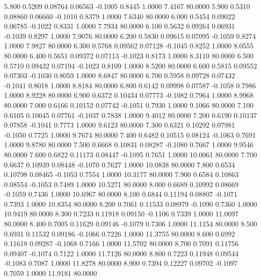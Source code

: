    5.800   0.5209   0.08764   0.06563  -0.1005   0.8445   1.0000   7.4167  80.0000
   5.900   0.5310   0.08860   0.06660  -0.1010   0.8379   1.0000   7.6340  80.0000
   6.000   0.5454   0.09022   0.06785  -0.1022   0.8331   1.0000   7.7934  80.0000
   6.100   0.5632   0.09264   0.06931  -0.1039   0.8297   1.0000   7.9076  80.0000
   6.200   0.5830   0.09615   0.07095  -0.1059   0.8274   1.0000   7.9827  80.0000
   6.300   0.5768   0.09562   0.07128  -0.1045   0.8252   1.0000   8.0555  80.0000
   6.400   0.5651   0.09372   0.07113  -0.1023   0.8173   1.0000   8.3110  80.0000
   6.500   0.5710   0.09432   0.07194  -0.1023   0.8109   1.0000   8.5200  80.0000
   6.600   0.5815   0.09552   0.07303  -0.1030   0.8059   1.0000   8.6847  80.0000
   6.700   0.5958   0.09728   0.07432  -0.1041   0.8018   1.0000   8.8184  80.0000
   6.800   0.6142   0.09998   0.07587  -0.1058   0.7986   1.0000   8.9228  80.0000
   6.900   0.6372   0.10434   0.07773  -0.1082   0.7964   1.0000   8.9968  80.0000
   7.000   0.6166   0.10152   0.07742  -0.1051   0.7930   1.0000   9.1066  80.0000
   7.100   0.6105   0.10045   0.07761  -0.1037   0.7838   1.0000   9.4012  80.0000
   7.200   0.6190   0.10137   0.07858  -0.1041   0.7773   1.0000   9.6123  80.0000
   7.300   0.6321   0.10292   0.07981  -0.1050   0.7725   1.0000   9.7674  80.0000
   7.400   0.6482   0.10515   0.08124  -0.1063   0.7691   1.0000   9.8780  80.0000
   7.500   0.6668   0.10831   0.08287  -0.1080   0.7667   1.0000   9.9546  80.0000
   7.600   0.6822   0.11173   0.08447  -0.1095   0.7651   1.0000  10.0061  80.0000
   7.700   0.6637   0.10939   0.08448  -0.1070   0.7627   1.0000  10.0838  80.0000
   7.800   0.6534   0.10798   0.08465  -0.1053   0.7554   1.0000  10.3177  80.0000
   7.900   0.6584   0.10863   0.08554  -0.1053   0.7489   1.0000  10.5271  80.0000
   8.000   0.6689   0.10992   0.08669  -0.1059   0.7436   1.0000  10.6967  80.0000
   8.100   0.6844   0.11194   0.08807  -0.1071   0.7393   1.0000  10.8354  80.0000
   8.200   0.7061   0.11533   0.08979  -0.1090   0.7360   1.0000  10.9419  80.0000
   8.300   0.7233   0.11918   0.09150  -0.1106   0.7339   1.0000  11.0097  80.0000
   8.400   0.7005   0.11629   0.09146  -0.1079   0.7306   1.0000  11.1154  80.0000
   8.500   0.6931   0.11532   0.09186  -0.1066   0.7226   1.0000  11.3755  80.0000
   8.600   0.6992   0.11618   0.09287  -0.1068   0.7166   1.0000  11.5702  80.0000
   8.700   0.7091   0.11756   0.09407  -0.1074   0.7122   1.0000  11.7126  80.0000
   8.800   0.7223   0.11948   0.09544  -0.1083   0.7087   1.0000  11.8278  80.0000
   8.900   0.7394   0.12227   0.09702  -0.1097   0.7059   1.0000  11.9181  80.0000
